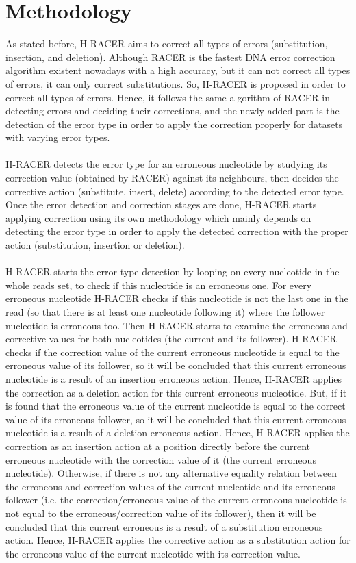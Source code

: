 \documentclass[12pt,openany]{llncs}
\begin{document}
\section{Methodology}
As stated before, H-RACER \cite{HRACER} aims to correct all types of errors (substitution, insertion, and deletion). Although RACER is the fastest DNA error correction algorithm existent nowadays with a high accuracy, but it can not correct all types of errors, it can only correct substitutions. So, H-RACER is proposed in order to correct all types of errors. Hence, it follows the same algorithm of RACER in detecting errors and deciding their corrections, and the newly added part is the detection of the error type in order to apply the correction properly for datasets with varying error types.
\\
\\
H-RACER detects the error type for an erroneous nucleotide by studying its correction value (obtained by RACER) against its neighbours, then decides the corrective action (substitute, insert, delete) according to the detected error type.
Once the error detection and correction stages are done, H-RACER starts applying correction using its own methodology which mainly depends on detecting the error type in order to apply the detected correction with the proper action (substitution, insertion or deletion).
\\
\\
H-RACER starts the error type detection by looping on every nucleotide in the whole reads set, to check if this nucleotide is an erroneous one. For every erroneous nucleotide H-RACER checks if this nucleotide is not the last one in the read (so that there is at least one nucleotide following it) where the follower nucleotide is erroneous too. Then H-RACER starts to examine the erroneous and corrective values for both nucleotides (the current and its follower). H-RACER checks if the correction value of the current erroneous nucleotide is equal to the erroneous value of its follower, so it will be concluded that this current erroneous nucleotide is a result of an insertion erroneous action. Hence, H-RACER applies the correction as a deletion action for this current erroneous nucleotide. But, if it is found that the erroneous value of the current nucleotide is equal to the correct value of its erroneous follower, so it will be concluded that this current erroneous nucleotide is a result of a deletion erroneous action. Hence, H-RACER applies the correction as an insertion action at a position directly before the current erroneous nucleotide with the correction value of it (the current erroneous nucleotide). Otherwise, if there is not any alternative equality relation between the erroneous and correction values of the current nucleotide and its erroneous follower (i.e. the correction/erroneous value of the current erroneous nucleotide is not equal to the erroneous/correction value of its follower), then it will be concluded that this current erroneous is a result of a substitution erroneous action. Hence, H-RACER applies the corrective action as a substitution action for the erroneous value of the current nucleotide with its correction value.
\end{document}
